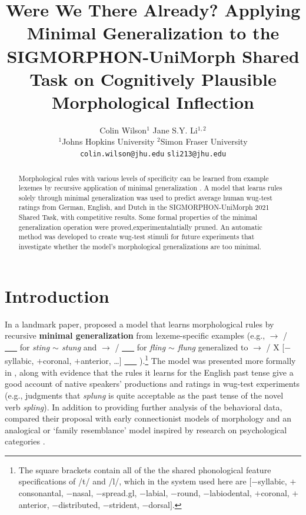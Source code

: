 \documentclass[11pt]{article}
\title{Were We There Already? Applying Minimal Generalization to the SIGMORPHON-UniMorph Shared Task on Cognitively Plausible Morphological Inflection}
\author{
  Colin Wilson$^1$ \qquad\qquad\qquad Jane S.Y. Li$^{1,2}$ \\
  $^1$Johns Hopkins University \qquad $^2$Simon Fraser University \\
  \texttt{colin.wilson@jhu.edu} \quad \texttt{sli213@jhu.edu}}
\begin{document}
\maketitle
\begin{abstract}
Morphological rules with various levels of specificity can be learned from example lexemes by recursive application of minimal generalization \citep{albright-hayes-2002-modeling, albright2003}. A model that learns rules solely through minimal generalization was used to predict average human wug-test ratings from German, English, and Dutch in the SIGMORPHON-UniMorph 2021 Shared Task, with competitive results. Some formal properties of the minimal generalization operation were proved,experimentalntially pruned. An automatic method was developed to create wug-test stimuli for future experiments that investigate whether the model's morphological generalizations are too minimal.
\end{abstract}

\section{Introduction}

In a landmark paper, \citet{albright2003} proposed a model that learns morphological rules by recursive \textbf{minimal generalization} from lexeme-specific examples (e.g.,  $\to$  /  \underline{\ \ \ }  for \emph{sting $\sim$ stung} and  $\to$  /  \underline{\ \ \ }  for \emph{fling $\sim$ flung} generalized to   $\to$  / X [$-$syllabic, $+$coronal, $+$anterior, \ldots] \underline{\ \ \ } ).\footnote{The square brackets contain all of the the shared phonological feature specifications of /t/ and /l/, which in the system used here are $[$$-$syllabic, $+$consonantal, $-$nasal, $-$spread.gl, $-$labial, $-$round, $-$labiodental, $+$coronal, $+$anterior, $-$distributed, $-$strident, $-$dorsal$]$.} The model was presented more formally in \citet{albright-hayes-2002-modeling}, along with evidence that the rules it learns for the English past tense give a good account of native speakers' productions and ratings in wug-test experiments (e.g., judgments that \textit{splung} is quite acceptable as the past tense of the novel verb \textit{spling}). In addition to providing further analysis of the behavioral data, \citet{albright2003} compared their proposal with early connectionist models of morphology \citep[e.g.,][]{plunkett1999} and an analogical or `family resemblance' model inspired by research on psychological categories \citep{nakisa2001}.
\end{document}

